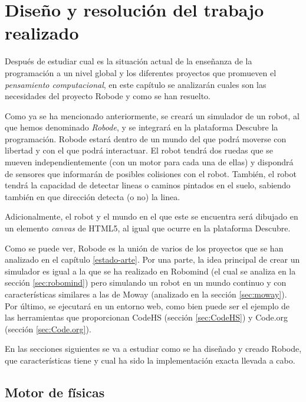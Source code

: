 \chapter{Diseño y resolución del trabajo realizado}
\label{diseno}

Después de estudiar cual es la situación actual de la enseñanza de la programación a un nivel global y los diferentes proyectos que promueven el \emph{pensamiento computacional}, en este capítulo se analizarán cuales son las necesidades del proyecto Robode y como se han resuelto.

Como ya se ha mencionado anteriormente, se creará un simulador de un robot, al que hemos denominado \emph{Robode}, y se integrará en la plataforma Descubre la programación. Robode  estará dentro de un mundo del que podrá moverse con libertad y con el que podrá interactuar. El robot tendrá dos ruedas que se mueven independientemente (con un motor para cada una de ellas) y dispondrá de sensores que informarán de posibles colisiones con el robot. También, el robot tendrá la capacidad de detectar lineas o caminos pintados en el suelo, sabiendo también en que dirección detecta (o no) la linea.

Adicionalmente, el robot y el mundo en el que este se encuentra será dibujado en un elemento \emph{canvas} de HTML5, al igual que ocurre en la plataforma Descubre.


Como se puede ver, Robode es la unión de varios de los proyectos que se han analizado en el capítulo \ref{estado-arte}. Por una parte, la idea principal de crear un simulador es igual a la que se ha realizado en Robomind (el cual se analiza en la sección \ref{sec:robomind}) pero simulando un robot en un mundo continuo y con características similares a las de Moway (analizado en la sección \ref{sec:moway}). Por último, se ejecutará en un entorno web, como bien puede ser el ejemplo de las herramientas que proporcionan CodeHS (sección \ref{sec:CodeHS}) y Code.org (sección \ref{sec:Code.org}). 


En las secciones siguientes se va a estudiar como se ha diseñado y creado Robode, que características tiene y cual ha sido la implementación exacta llevada a cabo.



\section{Motor de físicas}
\label{sec:mundo}


